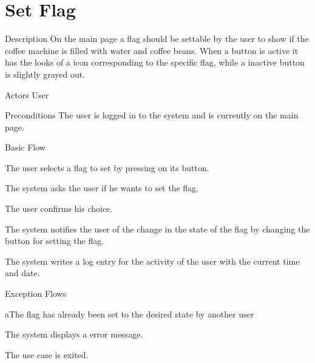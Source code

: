\section{Set Flag}

%
\begin{cpart}{Description}
On the main page a flag should be settable by the user to show if the coffee machine is filled with water and coffee beans. When a button is active it has the looks of a icon corresponding to the specific flag, while a inactive button is slightly grayed out.
\end{cpart}


%
\begin{cpart}{Actors}
User
\end{cpart}

%
\begin{cpart}{Preconditions}
The user is logged in to the system and is currently on the main page.
\end{cpart}

%
\begin{cpartList}{Basic Flow}
  \item The user selects a flag to set by pressing on its button.
  \item The system asks the user if he wants to set the flag.
  \item The user confirms his choice.
  \item The system notifies the user of the change in the state of the flag by changing the button for setting the flag.
  \item The system writes a log entry for the activity of the user with the current time and date.
\end{cpartList}

%
\begin{cpartList}{Exception Flows}
  \begin{innerList}{4}{a}{The flag has already been set to the desired state by another user}
    \item The system displays a error message.
    \item The use case is exited.
  \end{innerList}
\end{cpartList}

